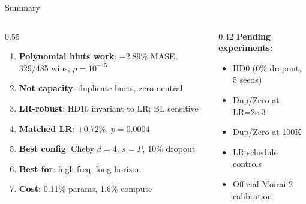 \documentclass[aspectratio=169,11pt]{beamer}
\begin{document}
\begin{frame}{Summary}

\begin{columns}
\begin{column}{0.55\textwidth}
\begin{enumerate}
    \item \textbf{Polynomial hints work}: $-2.89\%$ MASE, 329/485 wins, $p = 10^{-15}$
    \item \textbf{Not capacity}: duplicate hurts, zero neutral
    \item \textbf{LR-robust}: HD10 invariant to LR; BL sensitive
    \item \textbf{Matched LR}: $+0.72\%$, $p=0.0004$
    \item \textbf{Best config}: Cheby $d{=}4$, $s{=}P$, 10\% dropout
    \item \textbf{Best for}: high-freq, long horizon
    \item \textbf{Cost}: 0.11\% params, 1.6\% compute
\end{enumerate}
\end{column}
\begin{column}{0.42\textwidth}
\centering
\textbf{Pending experiments:}\\[0.5em]
\footnotesize
\begin{itemize}
    \item HD0 (0\% dropout, 5 seeds)
    \item Dup/Zero at LR=2e-3
    \item Dup/Zero at 100K
    \item LR schedule controls
    \item Official Moirai-2 calibration
\end{itemize}
\end{column}
\end{columns}

\end{frame}
\end{document}
